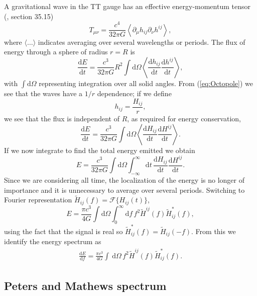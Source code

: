 \documentclass[useAMS,usedcolumn,usegraphicx,usenatbib]{mn2e}
\newcommand{\eqnref}[1]{(\ref{eq:#1})}
\newcommand{\dd}{\ensuremath{\mathrm{d}}}
\newcommand{\diff}[2]{\ensuremath{\frac{\dd {#1}}{\dd {#2}}}}
\newcommand{\intd}[4]{\ensuremath{\int_{#1}^{#2}{#3}\,\dd{#4}}}
\begin{document}
A gravitational wave in the TT gauge has an effective energy-momentum tensor (\citealt{Misner1973}, section 35.15)
\begin{equation}
T_{\mu\nu} = \frac{c^4}{32\pi G}\left\langle\partial_\mu h_{ij} \partial_\nu h^{ij}\right\rangle,
\end{equation}
where $\langle\ldots\rangle$ indicates averaging over several wavelengths or periods. The flux of energy through a sphere of radius $r = R$ is
\begin{equation}
\diff{E}{t} = \frac{c^3}{32\pi G} R^2 \int{\dd\Omega}\left\langle\diff{h_{ij}}{t}\diff{h^{ij}}{t}\right\rangle,
\end{equation}
with $\int{\dd\Omega}$ representing integration over all solid angles. From \eqnref{Octopole} we see that the waves have a $1/{r}$ dependence; if we define
\begin{equation}
h_{ij} = \frac{H_{ij}}{r},
\end{equation}
we see that the flux is independent of $R$, as required for energy conservation,
\begin{equation}
\diff{E}{t} = \frac{c^3}{32\pi G} \int{\dd\Omega}\left\langle\diff{H_{ij}}{t}\diff{H^{ij}}{t}\right\rangle.
\end{equation}
If we now integrate to find the total energy emitted we obtain
\begin{equation}
E = \frac{c^3}{32\pi G} \int{\dd\Omega}\int_{-\infty}^{\infty}{\dd t} \, \diff{H_{ij}}{t}\diff{H^{ij}}{t}.
\end{equation}
Since we are considering all time, the localization of the energy is no longer of importance and it is unnecessary to average over several periods. Switching to Fourier representation $\widetilde{H}_{ij}(f) = \mathscr{F}\{H_{ij}(t)\}$,
\begin{equation}
E = \frac{\pi c^3}{4 G} \int{\dd\Omega}\int_{0}^{\infty}{\dd f} \, f^2 \widetilde{H}^{ij}(f)\widetilde{H}_{ij}^*(f),
\end{equation}
using the fact that the signal is real so $\widetilde{H}_{ij}^*(f) = \widetilde{H}_{ij}(-f)$. From this we identify the energy spectrum as
\begin{align}
\diff{E}{f} = \frac{\pi c^3}{4 G} \intd{}{}{}{\Omega} \, f^2 \widetilde{H}^{ij}(f)\widetilde{H}_{ij}^*(f).
\label{eq:NK_dEdf}
\end{align}

\subsection{Peters and Mathews spectrum}
\end{document}
